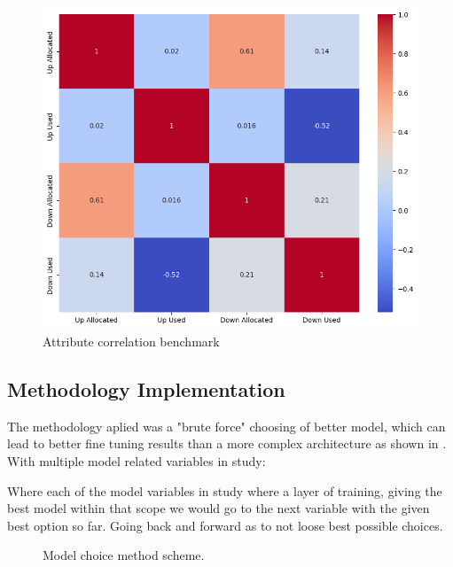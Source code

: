 \begin{figure}[H]
    \centering
    \includegraphics[width=\textwidth]{plots/correlation_heatmap_benchmark.png}
    \caption{Attribute correlation benchmark}
    \label{fig:Attribute_correlation_benchmark}
  \end{figure}
  
  


\subsection{Methodology Implementation}

The methodology aplied was a "brute force" choosing of better model, which can lead to better fine tuning results than a more complex architecture as shown in \cite{Liu2022}. With multiple model related variables in study:\par



Where each of the model variables in study where a layer of training, giving the best model within that scope we would go to the next variable with the given best option so far. Going back and forward as to not loose best possible choices.\par


\begin{figure}[H]
	\centering
	\resizebox{\linewidth}{!}{}
	\caption{Model choice method scheme.}
	\label{fig:method_training}
\end{figure}

